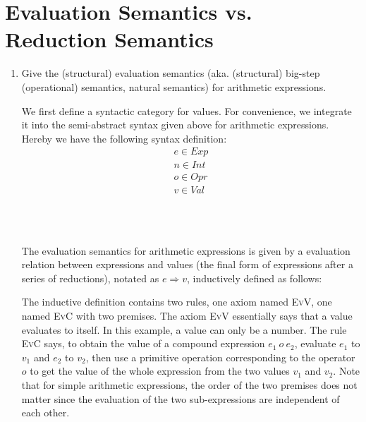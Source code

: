 \documentclass[a4paper,12pt]{article}
\newcommand{\term}[1]{\textsf{#1}}
\begin{document}
\section{Evaluation Semantics vs. Reduction Semantics}

\begin{enumerate}
 \item Give the \term{(structural) evaluation semantics} (aka. \term{(structural)
  big-step (operational) semantics}, \term{natural semantics}) for arithmetic expressions.

  We first define a syntactic category for values. For convenience, we integrate it into
  the semi-abstract syntax given above for arithmetic expressions. Hereby we have the
  following syntax definition:
  \begin{gather*}
   e \in Exp \\
   n \in Int \\
   o \in Opr \\
   v \in Val
  \end{gather*}

  \begin{grammar}
   \\
   \\
  \end{grammar}
  
  The evaluation semantics for arithmetic expressions is given by a evaluation relation
  between expressions and values (the final form of expressions after a series of
  reductions), notated as $e \Longrightarrow v$, inductively defined as follows:
  The inductive definition contains two rules, one axiom named \textsc{EvV}, one named
  \textsc{EvC} with two premises. The axiom \textsc{EvV} essentially says that a value
  evaluates to itself. In this example, a value can only be a number. The rule
  \textsc{EvC} says, to obtain the value of a compound expression $e_1\ o\ e_2$, evaluate
  $e_1$ to $v_1$ and $e_2$ to $v_2$, then use a primitive operation corresponding to the
  operator $o$ to get the value of the whole expression from the two values $v_1$ and $v_2$.
  Note that for simple arithmetic expressions, the order of the two premises does not
  matter since the evaluation of the two sub-expressions are independent of each other.


\end{enumerate}
\end{document}
